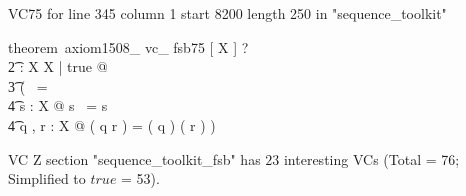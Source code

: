 \documentclass{article}
\begin{document}
VC75 for line 345 column 1 start 8200 length 250 in "sequence_toolkit"
\begin{zed}
theorem~axiom1508\_ vc\_ fsb75 [ X ] \vdash ? \\
   \t2 \exists \dcat : \seq \seq X \fun \seq X | true @ \\
    \t3 ( \dcat \langle \rangle~=~\langle \rangle \\
     \t4 \forall s : \seq X @ \dcat \langle s \rangle~= s \\
     \t4 \forall q , r : \seq \seq X @ \dcat ( q \cat r ) = ( \dcat q ) \cat ( \dcat r ) )
\end{zed}



 VC Z section "sequence_toolkit_fsb" has $23$ interesting VCs (Total = 76; Simplified to $true$ = 53).



\end{document}
